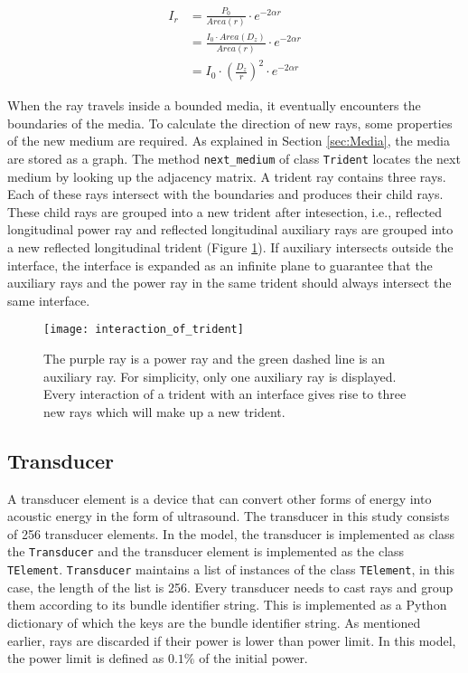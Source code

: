 \begin{equation} \label{eq:intensity_quadratically}
    \begin{aligned}
        I_r &= \frac{P_0}{Area(r)} \cdot e^{-2 \alpha r} \\
        &= \frac{I_0 \cdot Area(D_z)}{Area(r)} \cdot e^{-2 \alpha r} \\
        &= I_0 \cdot \left(\frac{D_z}{r}\right)^2 \cdot e^{-2 \alpha r}
    \end{aligned}
\end{equation}

When the ray travels inside a bounded media, it eventually encounters the boundaries of the media. To calculate the direction of new rays, some properties of the new medium are required. As explained in Section \ref{sec:Media}, the media are stored as a graph. The method \texttt{next\_medium} of class \texttt{Trident} locates the next medium by looking up the adjacency matrix. A trident ray contains three rays. Each of these rays intersect with the boundaries and produces their child rays. These child rays are grouped into a new trident after intesection, i.e., reflected longitudinal power ray and reflected longitudinal auxiliary rays are grouped into a new reflected longitudinal trident (Figure \ref{fig:interaction_of_trident}). If auxiliary intersects outside the interface, the interface is expanded as an infinite plane to guarantee that the auxiliary rays and the power ray in the same trident should always intersect the same interface.

\begin{figure}[h]
    \centering
    \texttt{[image: interaction\_of\_trident]}
    \caption{The purple ray is a power ray and the green dashed line is an auxiliary ray. For simplicity, only one auxiliary ray is displayed. Every interaction of a trident with an interface gives rise to three new rays which will make up a new trident.}
    \label{fig:interaction_of_trident}
\end{figure}


\subsection{Transducer}
A transducer element is a device that can convert other forms of energy into acoustic energy in the form of ultrasound. The transducer in this study consists of 256 transducer elements. In the model, the transducer is implemented as class the \texttt{Transducer} and the transducer element is implemented as the class \texttt{TElement}. \texttt{Transducer} maintains a list of instances of the class \texttt{TElement}, in this case, the length of the list is 256.
Every transducer needs to cast rays and group them according to its bundle identifier string. This is implemented as a Python dictionary of which the keys are the bundle identifier string. As mentioned earlier, rays are discarded if their power is lower than power limit. In this model, the power limit is defined as $0.1\%$ of the initial power. 

